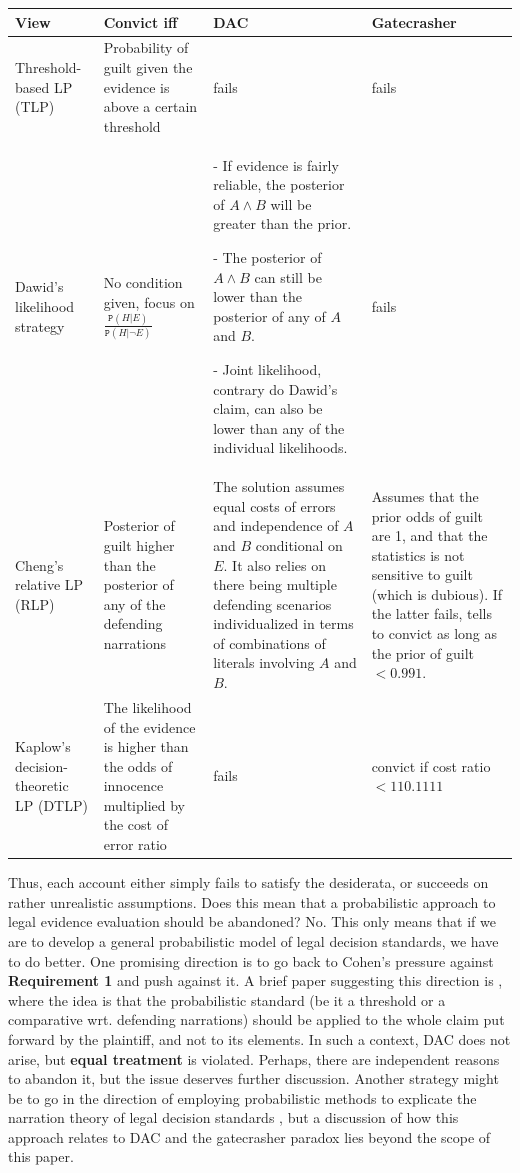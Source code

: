 \documentclass{ifcolog}
\newcommand{\pr}[1]{\mbox{$\mathtt{P}(#1)$}}
\newcommand{\n}{\neg}
\newcommand{\et}{\wedge}
\begin{document}
\begin{center}
\footnotesize 
 \begin{tabular}{@{}p{3cm}p{2.5cm}p{4cm}p{3cm}@{}}
\toprule
\textbf{View} & \textbf{Convict iff} & \textbf{DAC} & \textbf{Gatecrasher} \\ \midrule
Threshold-based LP (TLP) & Probability of guilt given the evidence is above a certain threshold & fails & fails \\
Dawid's likelihood strategy & No condition given, focus on $\frac{\pr{H\vert E}}{\pr{H\vert \n E}}$ & - If evidence is fairly reliable, the posterior of $A\et B$ will be greater than the prior.

- The posterior of $A\et B$ can still be lower than the posterior of any of $A$ and $B$.

- Joint likelihood, contrary do Dawid's claim, can also be lower than any of the individual likelihoods. & fails  \\
Cheng's relative LP (RLP)
& Posterior of guilt higher than the posterior of any of the defending narrations & The solution assumes equal costs of errors and independence of $A$ and $B$ conditional on $E$. It also relies on there being multiple defending scenarios individualized in terms of  combinations of literals involving $A$ and $B$. & Assumes that the prior odds of guilt are 1, and that the statistics is not sensitive to guilt (which is dubious). If the latter fails, tells to convict as long as the prior of guilt $<0.991$. \\
Kaplow's decision-theoretic LP (DTLP) &
The likelihood of the evidence is higher than the odds of innocence multiplied by the cost of error ratio & fails & convict if cost ratio $<110.1111$
\end{tabular} 
 \end{center} 


Thus, each account either simply fails to satisfy the desiderata, or succeeds on rather unrealistic assumptions.  Does this mean that a probabilistic approach to legal evidence evaluation should be abandoned? No. This only means that if we are to develop a general probabilistic model of legal decision standards, we have to do better. One promising direction is to go back to Cohen's pressure against \textbf{Requirement 1} and push against it. A brief paper suggesting this direction is \citep{DiBello2019plausibility}, where the idea is that the probabilistic standard (be it a threshold or a comparative wrt. defending narrations) should be applied to the whole claim put forward by the plaintiff, and not to its elements. In such a context, DAC does not arise, but \textbf{equal treatment} is violated. Perhaps, there are independent reasons to abandon it, but the issue deserves further discussion. Another strategy might be to go in the direction of employing probabilistic methods to explicate the narration theory of legal decision standards \citep{urbaniak2018narration}, but a discussion of how this approach relates to DAC and the gatecrasher paradox lies beyond the scope of this paper. 
\end{document}
